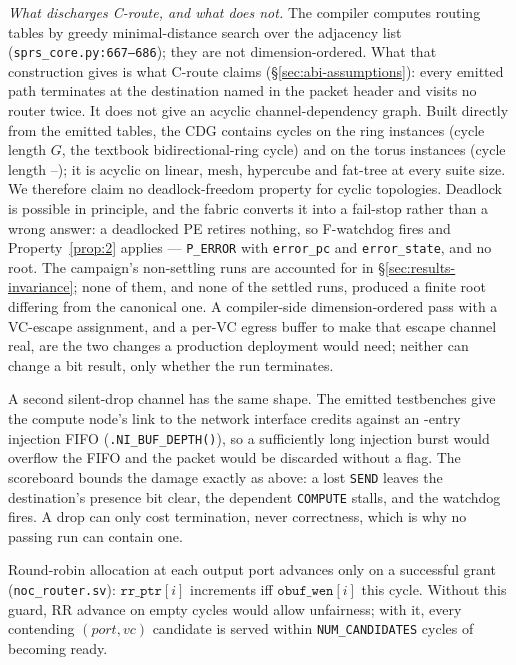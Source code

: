 \documentclass[journal,10pt]{IEEEtran}
\theoremstyle{plain}
\theoremstyle{definition}
\theoremstyle{remark}
\newcommand{\sv}[1]{\texttt{#1}}
\begin{document}
\emph{What discharges \textsf{C-route}, and what does not.} The compiler
computes routing tables by greedy minimal-distance search over the adjacency
list (\sv{sprs\_core.py:667--686}); they are not dimension-ordered. What that
construction gives is what \textsf{C-route} claims
(\S\ref{sec:abi-assumptions}): every emitted path terminates at the
destination named in the packet header and visits no router twice. It does
not give an acyclic channel-dependency graph. Built directly from the
emitted tables, the CDG contains cycles on the ring instances (cycle length
$G$, the textbook bidirectional-ring cycle) and on the torus instances
(cycle length \CdgTorusCycLo--\CdgTorusCycHi); it is acyclic on linear,
mesh, hypercube and fat-tree at every suite size. We therefore claim no
deadlock-freedom property for cyclic topologies. Deadlock is possible in
principle, and the fabric converts it into a fail-stop rather than a wrong
answer: a deadlocked PE retires nothing, so \textsf{F-watchdog} fires and
Property~\ref{prop:2} applies --- \texttt{P\_ERROR} with \texttt{error\_pc}
and \texttt{error\_state}, and no root. The campaign's non-settling runs are
accounted for in \S\ref{sec:results-invariance}; none of them, and none of
the settled runs, produced a finite root differing from the canonical one. A compiler-side
dimension-ordered pass with a VC-escape assignment, and a per-VC egress
buffer to make that escape channel real, are the two changes a production
deployment would need; neither can change a bit result, only whether the
run terminates.

A second silent-drop channel has the same shape. The emitted testbenches
give the compute node's link to the network interface \NiCredits{} credits
against an \NiFifoDepth-entry injection FIFO
(\sv{.NI\_BUF\_DEPTH(\NiFifoDepth)}), so a sufficiently long injection burst
would overflow the FIFO and the packet would be discarded without a flag.
The scoreboard bounds the damage exactly as above: a lost \texttt{SEND}
leaves the destination's presence bit clear, the dependent
\texttt{COMPUTE} stalls, and the watchdog fires. A drop can only cost
termination, never correctness, which is why no passing run can contain one.

Round-robin allocation at each output port advances only on a successful
grant (\sv{noc\_router.sv}): $\texttt{rr\_ptr}[i]$ increments iff
$\texttt{obuf\_wen}[i]$ this cycle. Without this guard, RR advance on empty
cycles would allow unfairness; with it, every contending $(port, vc)$
candidate is served within \texttt{NUM\_CANDIDATES} cycles of becoming
ready.
\end{document}
